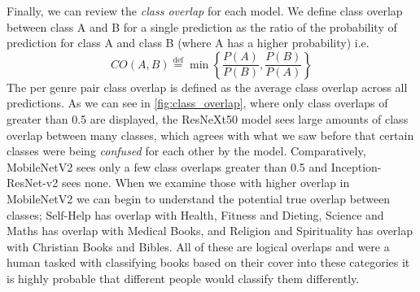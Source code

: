 \documentclass[12pt]{article}
\numberwithin{equation}{section}
\numberwithin{figure}{section}
\begin{document}
Finally, we can review the \emph{class overlap} for each model. We define class overlap between class A and B for a single prediction as the ratio of the probability of prediction for class A and class B (where A has a higher probability) i.e.
\begin{equation}
	CO(A, B) \stackrel{\mathrm{def}}{=} \min\left\{\frac{P(A)}{P(B)}, \frac{P(B)}{P(A)}\right\}
\end{equation}
The per genre pair class overlap is defined as the average class overlap across all predictions. As we can see in \cref{fig:class_overlap}, where only class overlaps of greater than 0.5 are displayed, the ResNeXt50 model sees large amounts of class overlap between many classes, which agrees with what we saw before that certain classes were being \emph{confused} for each other by the model. Comparatively, MobileNetV2 sees only a few class overlaps greater than 0.5 and Inception-ResNet-v2 sees none. When we examine those with higher overlap in MobileNetV2 we can begin to understand the potential true overlap between classes; Self-Help has overlap with Health, Fitness and Dieting, Science and Maths has overlap with Medical Books, and Religion and Spirituality has overlap with Christian Books and Bibles. All of these are logical overlaps and were a human tasked with classifying books based on their cover into these categories it is highly probable that different people would classify them differently. 
\end{document}
